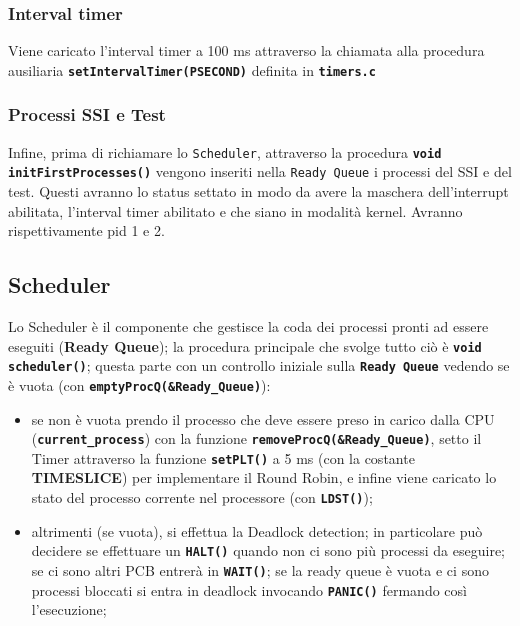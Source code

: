 \documentclass{article}
\begin{document}
	\subsubsection{Interval timer}
	Viene caricato l'interval timer a 100 ms attraverso la chiamata alla procedura
	ausiliaria \texttt{\textbf{setIntervalTimer(PSECOND)}} definita in \texttt{\textbf{timers.c}}

	\newpage

	\subsubsection{Processi SSI e Test}
	Infine, prima di richiamare lo \texttt{Scheduler}, attraverso la procedura
	\texttt{\textbf{void initFirstProcesses()}} vengono inseriti nella \texttt{Ready
	Queue} i processi del SSI e del test. Questi avranno lo status settato in modo
	da avere la maschera dell'interrupt abilitata, l'interval timer abilitato e
	che siano in modalità kernel. Avranno rispettivamente pid 1 e 2.

	\subsection{Scheduler}
	Lo Scheduler è il componente che gestisce la coda dei processi pronti ad
	essere eseguiti (\textbf{Ready Queue}); la procedura principale che svolge
	tutto ciò è \texttt{\textbf{void scheduler()}}; questa parte con un controllo
	iniziale sulla \texttt{\textbf{Ready Queue}} vedendo se è vuota (con \texttt{\textbf{emptyProcQ(\&Ready\_Queue)}}):
	\begin{itemize}
		\item se non è vuota prendo il processo che deve essere preso in carico dalla
			CPU (\texttt{\textbf{current\_process}}) con la funzione \texttt{\textbf{removeProcQ(\&Ready\_Queue)}},
			setto il Timer attraverso la funzione \texttt{\textbf{setPLT()}} a 5 ms (con
			la costante \textbf{TIMESLICE}) per implementare il Round Robin, e infine viene
			caricato lo stato del processo corrente nel processore (con \texttt{\textbf{LDST()}});

		\item altrimenti (se vuota), si effettua la Deadlock detection; in particolare
			può decidere se effettuare un \texttt{\textbf{HALT()}} quando non ci sono
			più processi da eseguire; se ci sono altri PCB entrerà in \texttt{\textbf{WAIT()}};
			se la ready queue è vuota e ci sono processi bloccati si entra in deadlock
			invocando \texttt{\textbf{PANIC()}} fermando così l'esecuzione;
	\end{itemize}
\end{document}
